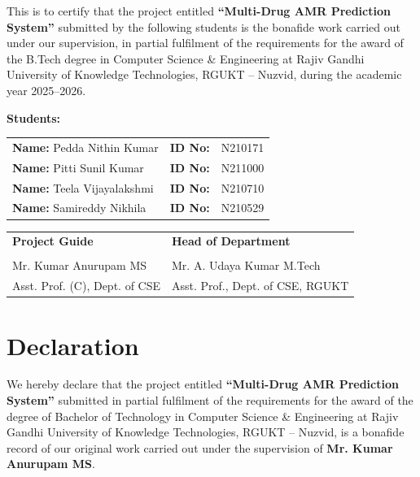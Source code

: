 \documentclass[12pt,a4paper]{report}
\begin{document}
This is to certify that the project entitled \textbf{``Multi-Drug AMR Prediction System''} submitted by the following students is the bonafide work carried out under our supervision, in partial fulfilment of the requirements for the award of the B.Tech degree in Computer Science \& Engineering at Rajiv Gandhi University of Knowledge Technologies, RGUKT -- Nuzvid, during the academic year 2025--2026.

\vspace{0.5cm}
\noindent\textbf{Students:}\\[0.2cm]
\renewcommand{\arraystretch}{1.4}
\begin{tabular}{@{}p{5.5cm}p{2cm}p{4cm}@{}}
  \textbf{Name:} Pedda Nithin Kumar        & \textbf{ID No:} & N210171 \\
  \textbf{Name:} Pitti Sunil Kumar        & \textbf{ID No:} & N211000 \\
  \textbf{Name:} Teela Vijayalakshmi       & \textbf{ID No:} & N210710 \\
  \textbf{Name:} Samireddy Nikhila     & \textbf{ID No:} & N210529 \\
\end{tabular}

\vspace{1.2cm}
\noindent
\begin{tabular}{@{}p{7cm}p{7cm}@{}}
  \textbf{Project Guide}               & \textbf{Head of Department}         \\[0.6em]
  \underline{\hspace{5.5cm}}           & \underline{\hspace{5.5cm}}          \\[0.2em]
  Mr. Kumar Anurupam MS                & Mr. A. Udaya Kumar M.Tech           \\
  Asst. Prof. (C), Dept. of CSE       & Asst. Prof., Dept. of CSE, RGUKT    \\
\end{tabular}

\chapter*{Declaration}
\thispagestyle{fancy}

We hereby declare that the project entitled \textbf{``Multi-Drug AMR Prediction System''} submitted in partial fulfilment of the requirements for the award of the degree of Bachelor of Technology in Computer Science \& Engineering at Rajiv Gandhi University of Knowledge Technologies, RGUKT -- Nuzvid, is a bonafide record of our original work carried out under the supervision of \textbf{Mr. Kumar Anurupam MS}.
\end{document}
